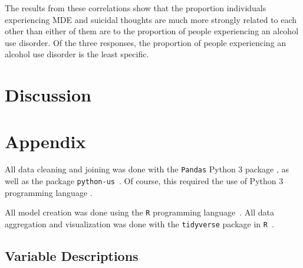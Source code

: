 \documentclass{article}
\begin{document}
The results from these correlations show that the proportion individuals
experiencing MDE and suicidal thoughts are much more strongly related to each
other than either of them are to the proportion of people experiencing
an alcohol use disorder.
Of the three responses, the proportion of people experiencing an
alcohol use disorder is the least specific.


\section{Discussion}

\section{Appendix}

All data cleaning and joining was done with the \texttt{Pandas} Python 3 package
\cite{python_pandas}, as well as the package \texttt{python-us}~\cite{python_us}.
Of course, this required the use of Python 3 programming language
\cite{python_lang}.

All model creation was done using the \texttt{R} programming
language~\cite{r_lang}.
All data aggregation and visualization was done with the
\texttt{tidyverse} package in \texttt{R}~\cite{r_tidyverse}.

\subsection{Variable Descriptions}\label{sec:variables}

\newcommand\censuscodes{https://www.census.gov/programs-surveys/acs/technical-documentation/code-lists.2018.html}
\newcommand\descentdesc[1]{ Proportion of the population which is of
    #1 descent. See \url{\censuscodes} for more
    pecise definitions.}
\newcommand\descentreason{Ethnicity is tied to socioeconomic status, which
    could in turn be correlated to one's financial status and mental health.
    Variables related to ethnicity were included to control for variation.}
\newcommand\agedescto[2]{Proportion of the population from #1 to #2 years old.}
\newcommand\agedescover[1]{Proportion of the population over #1 years old.}
\newcommand\agereason{Overall economic status could vary with age, so age
    variables were included to control for variation.}
\newcommand\educationdesc[1]{Proportion of the population 25 years of age and
    over whose maximum educational attainment is #1.}
\newcommand\educationreason{Educational attainment can be used as a general
    measure of socioeconomic status. Variables related to educational
    attainment were included to account for variation.}
\newcommand\maritaldesc[1]{Proportion of the population age 15 and older who
    have marital status ``#1".}
\newcommand\maritalreason{Marital status reflects general socioeconomic status.
    Variables related to marital status are included to account for variation.}
\end{document}
